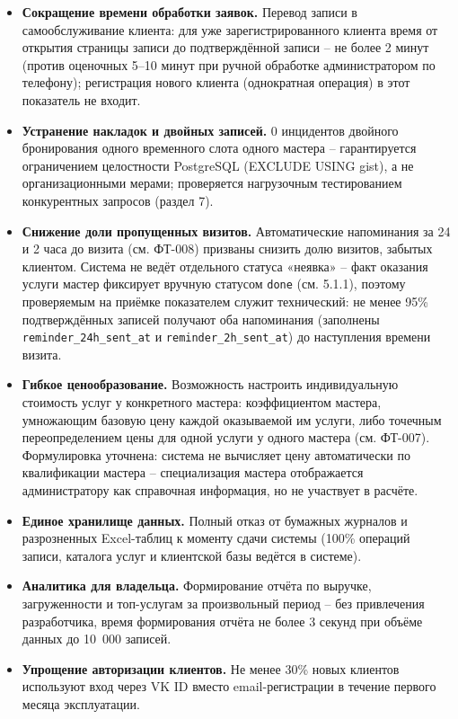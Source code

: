 \begin{itemize}
  \item \textbf{Сокращение времени обработки заявок.} Перевод записи в самообслуживание клиента: для уже зарегистрированного клиента время от открытия страницы записи до подтверждённой записи -- не более 2 минут (против оценочных 5--10 минут при ручной обработке администратором по телефону); регистрация нового клиента (однократная операция) в этот показатель не входит.
  \item \textbf{Устранение накладок и двойных записей.} 0 инцидентов двойного бронирования одного временного слота одного мастера -- гарантируется ограничением целостности PostgreSQL (EXCLUDE USING gist), а не организационными мерами; проверяется нагрузочным тестированием конкурентных запросов (раздел 7).
  \item \textbf{Снижение доли пропущенных визитов.} Автоматические напоминания за 24 и 2 часа до визита (см. ФТ-008) призваны снизить долю визитов, забытых клиентом. Система не ведёт отдельного статуса «неявка» -- факт оказания услуги мастер фиксирует вручную статусом \texttt{done} (см. 5.1.1), поэтому проверяемым на приёмке показателем служит технический: не менее 95\% подтверждённых записей получают оба напоминания (заполнены \texttt{reminder\_24h\_sent\_at} и \texttt{reminder\_2h\_sent\_at}) до наступления времени визита.
  \item \textbf{Гибкое ценообразование.} Возможность настроить индивидуальную стоимость услуг у конкретного мастера: коэффициентом мастера, умножающим базовую цену каждой оказываемой им услуги, либо точечным переопределением цены для одной услуги у одного мастера (см. ФТ-007). Формулировка уточнена: система не вычисляет цену автоматически по квалификации мастера -- специализация мастера отображается администратору как справочная информация, но не участвует в расчёте.
  \item \textbf{Единое хранилище данных.} Полный отказ от бумажных журналов и разрозненных Excel-таблиц к моменту сдачи системы (100\% операций записи, каталога услуг и клиентской базы ведётся в системе).
  \item \textbf{Аналитика для владельца.} Формирование отчёта по выручке, загруженности и топ-услугам за произвольный период -- без привлечения разработчика, время формирования отчёта не более 3 секунд при объёме данных до 10~000 записей.
  \item \textbf{Упрощение авторизации клиентов.} Не менее 30\% новых клиентов используют вход через VK ID вместо email-регистрации в течение первого месяца эксплуатации.
\end{itemize}

